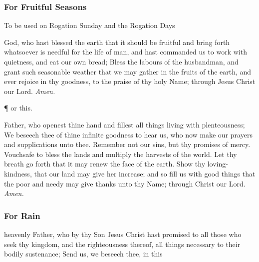 \subsubsection{For Fruitful Seasons}

\begin{rubric}
	{To be used on Rogation Sunday and the Rogation Days}
\end{rubric}
 God, who hast blessed the earth that it should be fruitful and bring forth whatsoever is needful for the life of man, and hast commanded us to work with quietness, and eat our own bread; Bless the labours of the husbandman, and grant such seasonable weather that we may gather in the fruits of the earth, and ever rejoice in thy goodness, to the praise of thy holy Name; through Jesus Christ our Lord. \textit{Amen.}

\vspace{0.25\baselineskip}

\begin{inhead}
	\P{ }or this.
\end{inhead}

\vspace{0.25\baselineskip}

 Father, who openest thine hand and fillest all things living with plenteousness; We beseech thee of thine infinite goodness to hear us, who now make our prayers and supplications unto thee. Remember not our sins, but thy promises of mercy. Vouchsafe to bless the lands and multiply the harvests of the world. Let thy breath go forth that it may renew the face of the earth. Show thy loving-kindness, that our land may give her increase; and so fill us with good things that the poor and needy may give thanks unto thy Name; through Christ our Lord. \textit{Amen.}

\subsubsection{For Rain}

 heavenly Father, who by thy Son Jesus Christ hast promised to all those who seek thy kingdom, and the righteousness thereof, all things necessary to their bodily sustenance; Send us, we beseech thee, in this 

